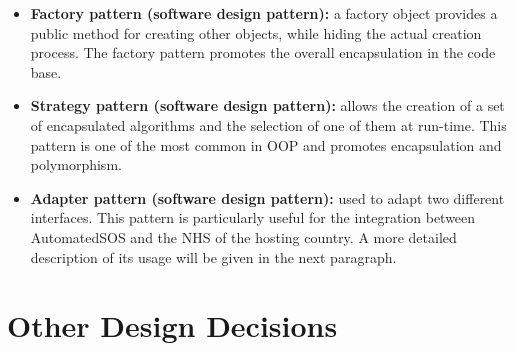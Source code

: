 \begin{itemize}
    \item \textbf{Factory pattern (software design pattern):} a factory object provides a public method for creating other objects, while hiding the actual creation process. The factory pattern promotes the overall encapsulation in the code base.
    \item \textbf{Strategy pattern (software design pattern):} allows the creation of a set of encapsulated algorithms and the selection of one of them at run-time. This pattern is one of the most common in OOP and promotes encapsulation and polymorphism.
    \item \textbf{Adapter pattern (software design pattern):} used to adapt two different interfaces. This pattern is particularly useful for the integration between AutomatedSOS and the NHS of the hosting country. A more detailed description of its usage will be given in the next paragraph. 
\end{itemize}

\section{Other Design Decisions}

